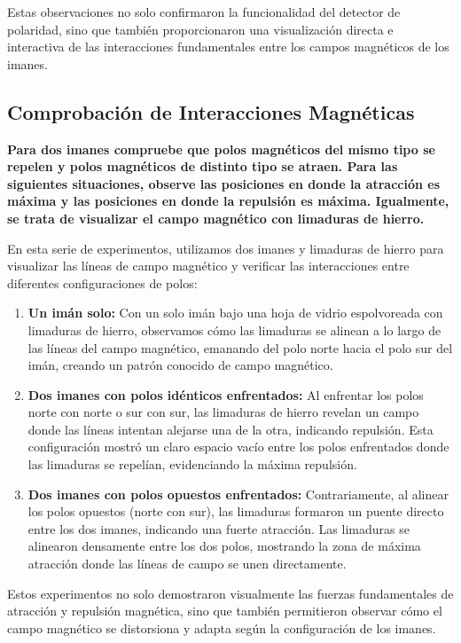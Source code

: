 Estas observaciones no solo confirmaron la funcionalidad del detector de polaridad, sino que también proporcionaron una visualización directa e interactiva de las interacciones fundamentales entre los campos magnéticos de los imanes.


\subsection{Comprobación de Interacciones Magnéticas}
\textbf{Para dos imanes compruebe que polos magnéticos del mismo tipo se repelen y polos magnéticos de distinto tipo se atraen. Para las siguientes situaciones, observe las posiciones en donde la atracción es máxima y las posiciones en donde la repulsión es máxima. Igualmente, se trata de visualizar el campo magnético con limaduras de hierro.}

En esta serie de experimentos, utilizamos dos imanes y limaduras de hierro para visualizar las líneas de campo magnético y verificar las interacciones entre diferentes configuraciones de polos:

\begin{enumerate}
    \item \textbf{Un imán solo:} Con un solo imán bajo una hoja de vidrio espolvoreada con limaduras de hierro, observamos cómo las limaduras se alinean a lo largo de las líneas del campo magnético, emanando del polo norte hacia el polo sur del imán, creando un patrón conocido de campo magnético.

    \item \textbf{Dos imanes con polos idénticos enfrentados:} Al enfrentar los polos norte con norte o sur con sur, las limaduras de hierro revelan un campo donde las líneas intentan alejarse una de la otra, indicando repulsión. Esta configuración mostró un claro espacio vacío entre los polos enfrentados donde las limaduras se repelían, evidenciando la máxima repulsión.

    \item \textbf{Dos imanes con polos opuestos enfrentados:} Contrariamente, al alinear los polos opuestos (norte con sur), las limaduras formaron un puente directo entre los dos imanes, indicando una fuerte atracción. Las limaduras se alinearon densamente entre los dos polos, mostrando la zona de máxima atracción donde las líneas de campo se unen directamente.
\end{enumerate}

Estos experimentos no solo demostraron visualmente las fuerzas fundamentales de atracción y repulsión magnética, sino que también permitieron observar cómo el campo magnético se distorsiona y adapta según la configuración de los imanes.

